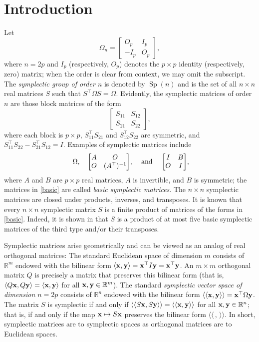 \documentclass[12pt]{article}
\theoremstyle{definition}
\theoremstyle{definition}
\theoremstyle{definition}
\numberwithin{figure}{section}
\numberwithin{equation}{section}
\newcommand{\R}{\mathbb{R}}
\newcommand{\by}{{\bf y}}
\newcommand{\bx}{{\bf x}}
\newcommand{\Sp}{\operatorname{Sp}}
\newcommand{\Rn}{\R^{n}}
\newcommand{\trans}{^{\top}}
\newcommand{\mtx}[1]{\begin{bmatrix} #1 \end{bmatrix}}
\newcommand{\x}{\times}
\begin{document}
\section{Introduction}\label{s:intro} 
Let 
\[ 
\Omega_{n} = \left[ \begin{array}{rc} O_p & I_p \\ 
-I_p &O_p \end{array} \right],\]
where $n=2p$ and  $I_p$ (respectively, $O_p$) denotes the $p\times p$
identity (respectively, zero) matrix; when the order is clear from context, we may omit the subscript.  
The {\it symplectic group of order $n$} is denoted by $\Sp(n)$
and is the set of all $n \x n$ real matrices $S$ such that $
S\trans \Omega S=\Omega$.
Evidently, the symplectic matrices of order $n$
are those block matrices  of the form 
\[
\left[ 
\begin{array}{rc} 
S_{11} & S_{12} \\  
S_{21} & S_{22} \end{array}
\right], 
\]
where each block is $p\x p$, $S_{11}\trans S_{21}$ and $S_{12}\trans S_{22}$ are symmetric, and $S_{11}\trans S_{22}-S_{21}\trans S_{12}=I$. 
Examples of symplectic matrices  include
\begin{align}
\label{basic}
\mbox{ $\Omega, \quad \mtx{A & O\\O & (A^\top)^{-1}}$, \quad  and \quad  $\mtx{I & B\\O & I}$},
\end{align}
where $A$ and $B$ are $p \times p$ real matrices, $A$ is invertible, and $B$ is symmetric; the matrices in \eqref{basic} are called \emph{basic symplectic matrices}. 
The $n\times n$ symplectic matrices are closed under products, inverses, and transposes. It is known that 
every $n\times n$ symplectic matrix $S$ is a finite product of matrices  of the forms in \eqref{basic}. Indeed, {it is shown in} \cite{JLX22} 
 that  $S$ is a product of at most five basic symplectic matrices of the third type and/or their transposes.



Symplectic matrices arise geometrically and can be viewed as an analog of real orthogonal matrices:  The standard Euclidean space of dimension $m$ consists of $\mathbb{R}^m$ endowed with 
the bilinear form $\langle \bx, \by\rangle= \bx^\top I \by= \bx^\top \by$. An $m\times m$ orthogonal matrix
$Q$ is precisely a matrix that preserves this bilinear form (that is, 
$\langle Q\bx, Q\by\rangle= \langle \bx, \by \rangle$ for all $\bx, \by \in \mathbb{R}^m$).
The  standard \textit{symplectic vector space of dimension $n=2p$} consists of $\Rn$  endowed with  the bilinear form  $\langle\langle \bx , \by \rangle\rangle= \bx^\top\Omega \by$.  The matrix $S$ is symplectic if and only if 
$\langle\langle S\bx, S \by \rangle\rangle= \langle\langle \bx, \by \rangle\rangle$ for all $\bx, \by \in \mathbb{R}^{n}$; that is, if and only if 
the map $\bx \mapsto S\bx$ preserves the bilinear form $\langle\langle \, , \, \rangle \rangle$.
In short, symplectic matrices are to symplectic spaces as orthogonal matrices are to Euclidean spaces. 
\end{document}
